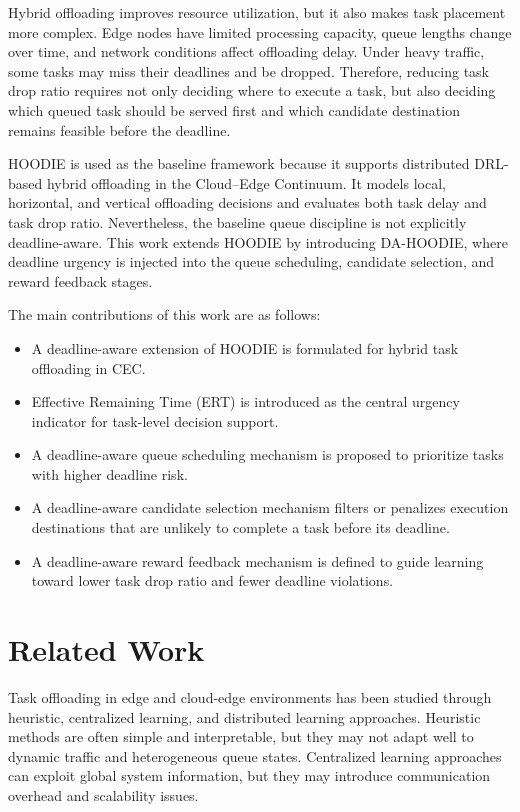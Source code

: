 \documentclass{article}
\begin{document}
Hybrid offloading improves resource utilization, but it also makes task placement more complex. Edge nodes have limited processing capacity, queue lengths change over time, and network conditions affect offloading delay. Under heavy traffic, some tasks may miss their deadlines and be dropped. Therefore, reducing task drop ratio requires not only deciding where to execute a task, but also deciding which queued task should be served first and which candidate destination remains feasible before the deadline.

HOODIE is used as the baseline framework because it supports distributed DRL-based hybrid offloading in the Cloud--Edge Continuum. It models local, horizontal, and vertical offloading decisions and evaluates both task delay and task drop ratio. Nevertheless, the baseline queue discipline is not explicitly deadline-aware. This work extends HOODIE by introducing DA-HOODIE, where deadline urgency is injected into the queue scheduling, candidate selection, and reward feedback stages.

The main contributions of this work are as follows:
\begin{itemize}
    \item A deadline-aware extension of HOODIE is formulated for hybrid task offloading in CEC.
    \item Effective Remaining Time (ERT) is introduced as the central urgency indicator for task-level decision support.
    \item A deadline-aware queue scheduling mechanism is proposed to prioritize tasks with higher deadline risk.
    \item A deadline-aware candidate selection mechanism filters or penalizes execution destinations that are unlikely to complete a task before its deadline.
    \item A deadline-aware reward feedback mechanism is defined to guide learning toward lower task drop ratio and fewer deadline violations.
\end{itemize}

\section{Related Work}
\label{sec:related_work}

Task offloading in edge and cloud-edge environments has been studied through heuristic, centralized learning, and distributed learning approaches. Heuristic methods are often simple and interpretable, but they may not adapt well to dynamic traffic and heterogeneous queue states. Centralized learning approaches can exploit global system information, but they may introduce communication overhead and scalability issues.
\end{document}

